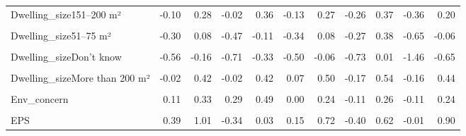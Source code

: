 \begin{table}
\begin{tabular}[t]{lrrrrrrrrrr}
Dwelling\_size151–200 m² & -0.10 & 0.28 & -0.02 & 0.36 & -0.13 & 0.27 & -0.26 & 0.37 & -0.36 & 0.20\\
\cellcolor{gray!10}{Dwelling\_size26–50 m²} & \cellcolor{gray!10}{-0.34} & \cellcolor{gray!10}{0.14} & \cellcolor{gray!10}{-0.39} & \cellcolor{gray!10}{0.05} & \cellcolor{gray!10}{-0.29} & \cellcolor{gray!10}{0.26} & \cellcolor{gray!10}{-0.52} & \cellcolor{gray!10}{0.38} & \cellcolor{gray!10}{-0.86} & \cellcolor{gray!10}{-0.04}\\
Dwelling\_size51–75 m² & -0.30 & 0.08 & -0.47 & -0.11 & -0.34 & 0.08 & -0.27 & 0.38 & -0.65 & -0.06\\
\cellcolor{gray!10}{Dwelling\_size76–100 m²} & \cellcolor{gray!10}{-0.35} & \cellcolor{gray!10}{-0.02} & \cellcolor{gray!10}{-0.27} & \cellcolor{gray!10}{0.03} & \cellcolor{gray!10}{-0.30} & \cellcolor{gray!10}{0.06} & \cellcolor{gray!10}{-0.30} & \cellcolor{gray!10}{0.28} & \cellcolor{gray!10}{-0.42} & \cellcolor{gray!10}{0.07}\\
Dwelling\_sizeDon't know & -0.56 & -0.16 & -0.71 & -0.33 & -0.50 & -0.06 & -0.73 & 0.01 & -1.46 & -0.65\\
\cellcolor{gray!10}{Dwelling\_sizeLess than 25 m²} & \cellcolor{gray!10}{-0.92} & \cellcolor{gray!10}{0.03} & \cellcolor{gray!10}{-1.54} & \cellcolor{gray!10}{-0.56} & \cellcolor{gray!10}{-1.01} & \cellcolor{gray!10}{0.10} & \cellcolor{gray!10}{-0.44} & \cellcolor{gray!10}{0.97} & \cellcolor{gray!10}{-1.28} & \cellcolor{gray!10}{0.17}\\
Dwelling\_sizeMore than 200 m² & -0.02 & 0.42 & -0.02 & 0.42 & 0.07 & 0.50 & -0.17 & 0.54 & -0.16 & 0.44\\
\cellcolor{gray!10}{Rural} & \cellcolor{gray!10}{-0.01} & \cellcolor{gray!10}{0.23} & \cellcolor{gray!10}{-0.05} & \cellcolor{gray!10}{0.17} & \cellcolor{gray!10}{-0.04} & \cellcolor{gray!10}{0.22} & \cellcolor{gray!10}{-0.01} & \cellcolor{gray!10}{0.39} & \cellcolor{gray!10}{0.01} & \cellcolor{gray!10}{0.41}\\
Env\_concern & 0.11 & 0.33 & 0.29 & 0.49 & 0.00 & 0.24 & -0.11 & 0.26 & -0.11 & 0.24\\
\cellcolor{gray!10}{Gov\_support} & \cellcolor{gray!10}{7.10} & \cellcolor{gray!10}{17.53} & \cellcolor{gray!10}{6.48} & \cellcolor{gray!10}{16.97} & \cellcolor{gray!10}{7.30} & \cellcolor{gray!10}{18.04} & \cellcolor{gray!10}{8.41} & \cellcolor{gray!10}{20.63} & \cellcolor{gray!10}{8.28} & \cellcolor{gray!10}{23.86}\\
EPS & 0.39 & 1.01 & -0.34 & 0.03 & 0.15 & 0.72 & -0.40 & 0.62 & -0.01 & 0.90\\

\end{tabular}
\end{table}
